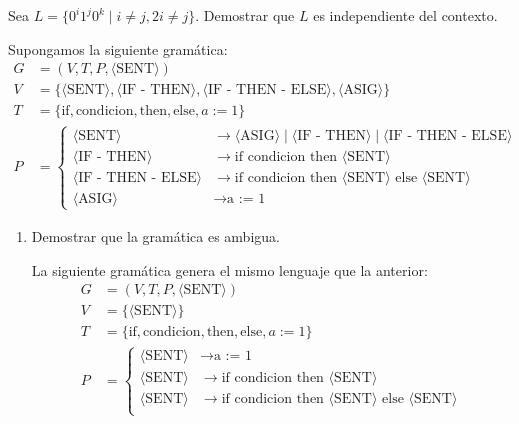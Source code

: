 \begin{ejercicio}\label{ej:1.4.21}
    Sea $L = \{ 0^i 1^j 0^k \mid i \neq j, 2i \neq j \}$. Demostrar que $L$ es independiente del contexto.
\end{ejercicio}

\begin{ejercicio}\label{ej:1.4.22}
    Supongamos la siguiente gramática:
    \begin{align*}
        G&=\left( V,T,P,\langle \text{SENT} \rangle \right)\\
        V&=\{ \langle \text{SENT} \rangle, \langle \text{IF - THEN} \rangle, \langle \text{IF - THEN - ELSE} \rangle, \langle \text{ASIG} \rangle \}\\
        T&=\{ \text{if}, \text{condicion}, \text{then}, \text{else}, a := 1 \} \\
        P&=\left\{
            \begin{aligned}
                \langle \text{SENT} \rangle &\rightarrow \langle \text{ASIG} \rangle \mid \langle \text{IF - THEN} \rangle \mid \langle \text{IF - THEN - ELSE} \rangle\\
                \langle \text{IF - THEN} \rangle &\rightarrow \text{if condicion then } \langle \text{SENT} \rangle\\
                \langle \text{IF - THEN - ELSE} \rangle &\rightarrow \text{if condicion then } \langle \text{SENT} \rangle \text{ else } \langle \text{SENT} \rangle\\
                \langle \text{ASIG} \rangle &\rightarrow \text{a := 1}
            \end{aligned}
        \right.
    \end{align*}
    \begin{enumerate}
        \item Demostrar que la gramática es ambigua.
        
        La siguiente gramática genera el mismo lenguaje que la anterior:
        \begin{align*}
            G&=\left( V,T,P,\langle \text{SENT} \rangle \right)\\
            V&=\{ \langle \text{SENT} \rangle\}\\
            T&=\{ \text{if}, \text{condicion}, \text{then}, \text{else}, a := 1 \} \\
            P&=\left\{
                \begin{aligned}
                    \langle \text{SENT} \rangle &\rightarrow \text{a := 1} \\
                    \langle \text{SENT} \rangle &\rightarrow \text{if condicion then } \langle \text{SENT} \rangle \\
                    \langle \text{SENT} \rangle &\rightarrow \text{if condicion then } \langle \text{SENT} \rangle \text{ else } \langle \text{SENT} \rangle\\
                \end{aligned}
            \right.
        \end{align*}


\end{enumerate}
\end{ejercicio}
